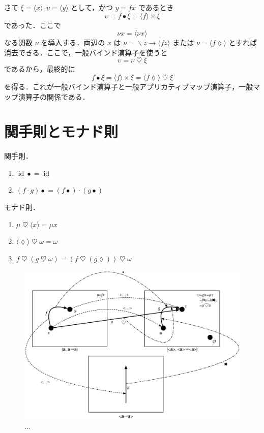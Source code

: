 \documentclass[a4paper]{jsbook}
\newcommand{\mPureWith}[1]{\langle#1\rangle}
\newcommand{\mAnonParameter}{\lozenge}
\DeclareMathOperator{\mId}{\mathrm{id}}
\DeclareMathOperator{\mLambda}{\backslash}
\DeclareMathOperator{\mLambdaArrow}{\rightarrow}
\DeclareMathOperator{\mComp}{\cdot}
\DeclareMathOperator{\mMap}{\bullet}
\DeclareMathOperator{\mAppMap}{\times}
\DeclareMathOperator{\mBind}{\heartsuit}%
\newcommand{\mLambdaExp}[2]{\mLambda{#1}\mLambdaArrow{#2}}
\begin{document}
さて $\xi=\mPureWith{x},\upsilon=\mPureWith{y}$ として，かつ $y=fx$ であるとき
\begin{equation}
\upsilon=f\mMap\xi=\mPureWith{f}\mAppMap\xi
\end{equation}
であった．ここで
\begin{equation}
\nu x=\mPureWith{\nu x}
\end{equation}
なる関数 $\nu$ を導入する．両辺の $x$ は $\nu=\mLambdaExp{z}{\mPureWith{fz}}$ または $\nu=\mPureWith{f\mAnonParameter}$ とすれば消去できる．ここで，一般バインド演算子を使うと
\begin{equation}
\upsilon=\nu\mBind\xi
\end{equation}
であるから，最終的に
\begin{equation}
f\mMap\xi=\mPureWith{f}\mAppMap\xi=\mPureWith{f\mAnonParameter}\mBind\xi
\end{equation}
を得る．これが一般バインド演算子と一般アプリカティブマップ演算子，一般マップ演算子の関係である．


\section{関手則とモナド則}

関手則．
\begin{enumerate}
\item $\mId\mMap=\mId$
\item $(f\mComp g)\mMap=(f\mMap)\mComp{}(g\mMap)$%
\end{enumerate}

モナド則．
\begin{enumerate}
\item $\mu\mBind{}\mPureWith{x}=\mu 
x$
\item $\mPureWith{\mAnonParameter}\mBind\omega=\omega$
\item $f\mBind{}(g\mBind\omega)=(f\mBind{}(g\mAnonParameter))\mBind\omega$
\end{enumerate}


\begin{figure}
\begin{center}
\includegraphics[width=140mm]{fig/functor.eps}
\end{center}
\caption{...}
\label{fig:functor}
\end{figure}
\end{document}
